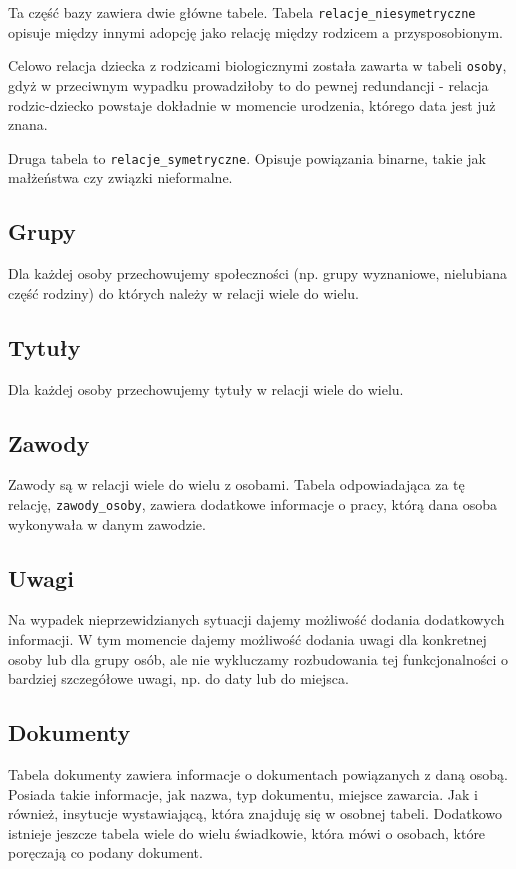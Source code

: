 \documentclass{article}
\begin{document}
Ta część bazy zawiera dwie główne tabele. Tabela \texttt{relacje\_niesymetryczne} opisuje między innymi adopcję jako relację między rodzicem a przysposobionym.

Celowo relacja dziecka z rodzicami biologicznymi została zawarta w tabeli \texttt{osoby}, gdyż w przeciwnym wypadku prowadziłoby to do pewnej redundancji - relacja
rodzic-dziecko powstaje dokładnie w momencie urodzenia, którego data jest już znana.

Druga tabela to \texttt{relacje\_symetryczne}. Opisuje powiązania binarne, takie jak małżeństwa czy związki nieformalne.

\subsection{Grupy}

Dla każdej osoby przechowujemy społeczności (np. grupy wyznaniowe, nielubiana część rodziny) do których należy w relacji wiele do wielu.

\subsection{Tytuły}

Dla każdej osoby przechowujemy tytuły w relacji wiele do wielu.

\subsection{Zawody}

Zawody są w relacji wiele do wielu z osobami. Tabela odpowiadająca za tę relację, \texttt{zawody\_osoby}, zawiera dodatkowe informacje o pracy, którą dana osoba wykonywała w danym zawodzie.

\subsection{Uwagi}

Na wypadek nieprzewidzianych sytuacji dajemy możliwość dodania dodatkowych informacji. W tym momencie dajemy możliwość dodania uwagi dla konkretnej osoby lub dla grupy osób, ale nie wykluczamy rozbudowania tej funkcjonalności o bardziej szczegółowe uwagi, np. do daty lub do miejsca.

\subsection{Dokumenty}

Tabela dokumenty zawiera informacje o dokumentach powiązanych z daną osobą. Posiada takie informacje, jak nazwa, typ dokumentu, miejsce zawarcia. Jak i również, insytucje wystawiającą, która znajduję się w osobnej tabeli. Dodatkowo istnieje jeszcze tabela wiele do wielu świadkowie, która mówi o osobach, które poręczają co podany dokument.
\end{document}
